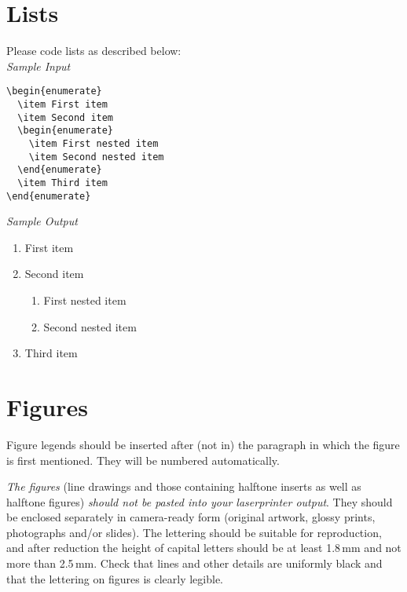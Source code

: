 \section {Lists}
%
Please code lists as described below:\\[2mm]
{\it Sample  Input}
\begin{verbatim}
\begin{enumerate}
  \item First item
  \item Second item
  \begin{enumerate}
    \item First nested item
    \item Second nested item
  \end{enumerate}
  \item Third item
\end{enumerate}
\end{verbatim}
{\it Sample Output}
 \begin{enumerate}
\item First item
\item Second item
  \begin{enumerate}
    \item First nested item
    \item Second nested item
  \end{enumerate}
\item Third item
\end{enumerate}
%
\section {Figures}
%
Figure legends should be inserted after (not in)
the  paragraph in which the figure is first mentioned.
They will be numbered automatically.

{\it The figures\/} (line drawings and those containing halftone inserts
as well as halftone figures) {\it should not be pasted into your
laserprinter output}. They should be enclosed separately in camera-ready
form (original artwork, glossy prints, photographs and/or slides). The
lettering should be suitable for reproduction, and after reduction the
height of capital letters should be at least
1.8\,mm and not more than 2.5\,mm.
Check that lines and other details are uniformly black and
that the lettering on figures is clearly legible.


